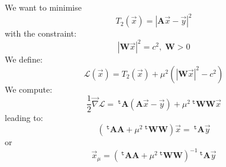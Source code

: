 \documentclass[aps]{revtex4}
\newcommand{\mymat}[1]{\boldsymbol{#1}}
\newcommand{\mytrn}[1]{~^{\mathtt{t}}\!{#1}}
\newcommand{\mygrad}{\vec{\nabla}}
\newcommand{\mynorm}[1]{\left\vert{#1}\right\vert}
\begin{document}
We want to minimise
\begin{equation}
	T_2\left(\vec{x}\right) = \mynorm{\mymat{A} \vec{x} - \vec{y}}^2
\end{equation}
with the constraint:
\begin{equation}
	\mynorm{\mymat{W}\vec{x}}^2 = c^2,\;\mymat{W}>0
\end{equation}
We define:
\begin{equation}
	\mathcal{L}\left(\vec{x}\right) = T_2\left(\vec{x}\right)  + \mu^2 \left( \mynorm{\mymat{W}\vec{x}}^2 - c^2\right)
\end{equation}
We compute:
\begin{equation}
	\frac{1}{2}\mygrad \mathcal{L} = \mytrn{\mymat{A}} \left( \mymat{A} \vec{x} - \vec{y}\right) + \mu^2 \mytrn{\mymat{W}}\mymat{W} \vec{x}
\end{equation}
leading to:
\begin{equation}
	\left(\mytrn{\mymat{A}}\mymat{A}+\mu^2 \mytrn{\mymat{W}}\mymat{W}\right) \vec{x} = \mytrn{\mymat{A}} \vec{y}
\end{equation}
or
\begin{equation}
	\vec{x}_\mu = \left(\mytrn{\mymat{A}}\mymat{A}+\mu^2 \mytrn{\mymat{W}}\mymat{W}\right)^{-1} \mytrn{\mymat{A}} \vec{y}
\end{equation}
\end{document}
